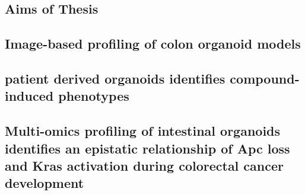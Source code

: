 \begin{flushleft}
\section{Aims of Thesis}
\subsection{Image-based profiling of colon organoid models}
\subsection{patient derived organoids identifies compound-induced phenotypes}
\subsection{Multi-omics profiling of intestinal organoids identifies an epistatic relationship of Apc loss and Kras activation during colorectal cancer development}
\end{flushleft}


